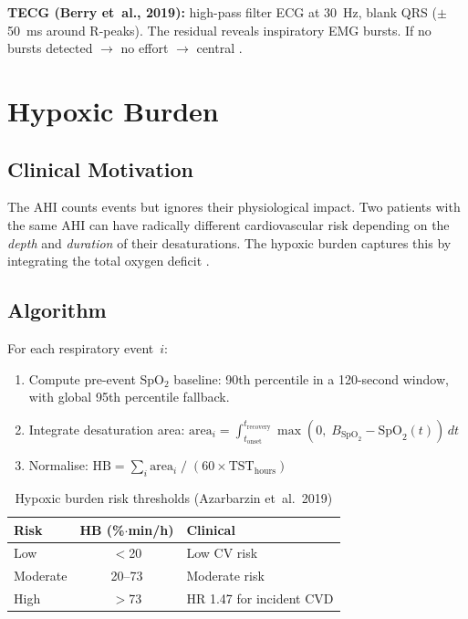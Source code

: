 \documentclass[11pt,a4paper]{article}
\begin{document}
\textbf{TECG (Berry et~al., 2019):} high-pass filter ECG at 30~Hz,
blank QRS ($\pm$50~ms around R-peaks). The residual reveals inspiratory
EMG bursts. If no bursts detected $\to$ no effort $\to$ central
\cite{berry2019}.

\section{Hypoxic Burden}
\label{sec:hb}

\subsection{Clinical Motivation}

The AHI counts events but ignores their physiological impact.
Two patients with the same AHI can have radically different
cardiovascular risk depending on the \emph{depth} and \emph{duration}
of their desaturations. The hypoxic burden captures this by integrating
the total oxygen deficit \cite{azarbarzin2019}.

\subsection{Algorithm}

For each respiratory event~$i$:

\begin{enumerate}[nosep]
  \item Compute pre-event SpO$_2$ baseline: 90th percentile in a
    120-second window, with global 95th percentile fallback.
  \item Integrate desaturation area:
    $\text{area}_i = \int_{t_{\text{onset}}}^{t_{\text{recovery}}}
    \max(0,\; B_{\text{SpO}_2} - \text{SpO}_2(t))\, dt$
  \item Normalise:
    $\text{HB} = \sum_i \text{area}_i \;/\; (60 \times \text{TST}_{\text{hours}})$
\end{enumerate}

\begin{table}[H]
\centering\small
\caption{Hypoxic burden risk thresholds (Azarbarzin et~al.\ 2019)}
\begin{tabular}{@{}lcl@{}}
\toprule
\textbf{Risk} & \textbf{HB (\%$\cdot$min/h)} & \textbf{Clinical} \\
\midrule
Low      & $<$20  & Low CV risk \\
Moderate & 20--73 & Moderate risk \\
High     & $>$73  & HR 1.47 for incident CVD \\
\bottomrule
\end{tabular}
\end{table}
\end{document}
